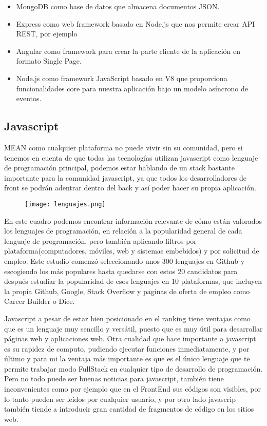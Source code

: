 \begin{itemize}

    \item MongoDB como base de datos que almacena documentos JSON.

    
    \item Express como web framework basado en Node.js que nos permite crear API REST, por ejemplo


    \item Angular como framework para crear la parte cliente de la aplicación en formato Single Page.

    
    \item Node.js como framework JavaScript basado en V8 que proporciona funcionalidades core para nuestra aplicación bajo un modelo asíncrono de eventos.
 
\end{itemize}


\subsection{Javascript}

MEAN como cualquier plataforma no puede vivir sin su comunidad, pero si tenemos en cuenta de que todas las tecnologías utilizan javascript como lenguaje de programación principal, podemos estar hablando de un stack bastante importante para la comunidad javascript, ya que todos los desarrolladores de front se podrán adentrar dentro del back y así poder hacer su propia aplicación.


\begin{figure}[H]
    \centering
    \texttt{[image: lenguajes.png]}
\end{figure}

En este cuadro podemos encontrar información relevante de cómo están valorados los lenguajes de programación, en relación a la popularidad general de cada lenguaje de programación, pero también aplicando filtros por plataforma(computadores, móviles, web y sistemas embebidos) y por solicitud de empleo. Este estudio comenzó seleccionando unos 300 lenguajes en Github y escogiendo los más populares hasta quedarse con estos 20 candidatos para después estudiar la popularidad de esos lenguajes en 10 plataformas, que incluyen la propia Github, Google, Stack Overflow y paginas de oferta de empleo como Career Builder o Dice. 

Javascript a pesar de estar bien posicionado en el ranking tiene ventajas como que es un lenguaje muy sencillo y versátil, puesto que es muy útil para desarrollar páginas web y aplicaciones web. Otra cualidad que hace importante a javascript es su rapidez de computo, pudiendo ejecutar funciones inmediatamente, y por último y para mi la ventaja más importante es que es el único lenguaje que te permite trabajar modo FullStack en cualquier tipo de desarrollo de programación. Pero no todo puede ser buenas noticias para javascript, también tiene inconvenientes como por ejemplo que en el FrontEnd sus códigos son visibles, por lo tanto pueden ser leídos por cualquier usuario, y por otro lado javascrip también tiende a introducir gran cantidad de fragmentos de código en los sitios web.

